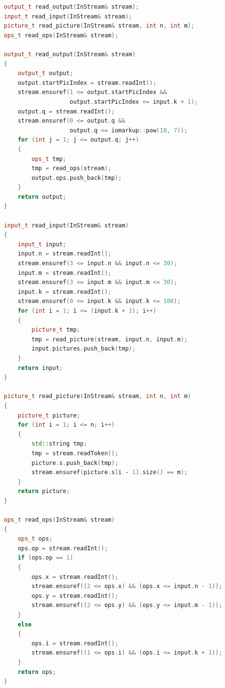 \documentclass[times,specification,annotation]{style/itmo-student-thesis/itmo-student-thesis}
\begin{document}
\begin{lstlisting}[caption={Часть сгенерированного кода чекера на языке C++},label={gen-checker-cpp},language=C++]
output_t read_output(InStream& stream);
input_t read_input(InStream& stream);
picture_t read_picture(InStream& stream, int n, int m);
ops_t read_ops(InStream& stream);

output_t read_output(InStream& stream)
{
    output_t output;
    output.startPicIndex = stream.readInt();
    stream.ensuref(1 <= output.startPicIndex &&
                   output.startPicIndex <= input.k + 1);
    output.q = stream.readInt();
    stream.ensuref(0 <= output.q &&
                   output.q <= iomarkup::pow(10, 7));
    for (int j = 1; j <= output.q; j++)
    {
        ops_t tmp;
        tmp = read_ops(stream);
        output.ops.push_back(tmp);
    }
    return output;
}

input_t read_input(InStream& stream)
{
    input_t input;
    input.n = stream.readInt();
    stream.ensuref(3 <= input.n && input.n <= 30);
    input.m = stream.readInt();
    stream.ensuref(3 <= input.m && input.m <= 30);
    input.k = stream.readInt();
    stream.ensuref(0 <= input.k && input.k <= 100);
    for (int i = 1; i <= (input.k + 1); i++)
    {
        picture_t tmp;
        tmp = read_picture(stream, input.n, input.m);
        input.pictures.push_back(tmp);
    }
    return input;
}

picture_t read_picture(InStream& stream, int n, int m)
{
    picture_t picture;
    for (int i = 1; i <= n; i++)
    {
        std::string tmp;
        tmp = stream.readToken();
        picture.s.push_back(tmp);
        stream.ensuref(picture.s[i ‐ 1].size() == m);
    }
    return picture;
}

ops_t read_ops(InStream& stream)
{
    ops_t ops;
    ops.op = stream.readInt();
    if (ops.op == 1)
    {
        ops.x = stream.readInt();
        stream.ensuref((2 <= ops.x) && (ops.x <= input.n - 1));
        ops.y = stream.readInt();
        stream.ensuref((2 <= ops.y) && (ops.y <= input.m - 1));
    }
    else
    {
        ops.i = stream.readInt();
        stream.ensuref((1 <= ops.i) && (ops.i <= input.k + 1));
    }
    return ops;
}
\end{lstlisting}
\end{document}
